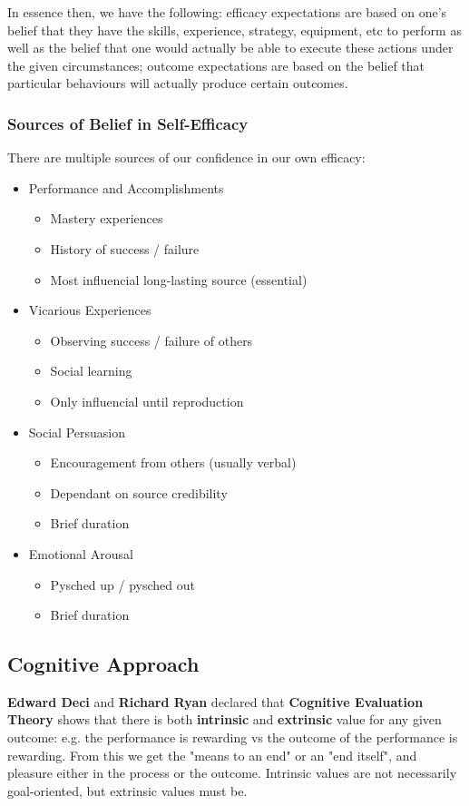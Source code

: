 \documentclass[12pt]{article}
\begin{document}
In essence then, we have the following: efficacy expectations are based on one's belief that they have the skills, experience, strategy, equipment, etc to perform as well as the belief that one would actually be able to execute these actions under the given circumstances; outcome expectations are based on the belief that particular behaviours will actually produce certain outcomes.

\subsubsection*{Sources of Belief in Self-Efficacy}
There are multiple sources of our confidence in our own efficacy:
\begin{itemize}
\item Performance and Accomplishments
\begin{itemize}
\item Mastery experiences
\item History of success / failure
\item Most influencial long-lasting source (essential)
\end{itemize}
\item Vicarious Experiences
\begin{itemize}
\item Observing success / failure of others
\item Social learning
\item Only influencial until reproduction
\end{itemize}
\item Social Persuasion
\begin{itemize}
\item Encouragement from others (usually verbal)
\item Dependant on source credibility
\item Brief duration
\end{itemize}
\item Emotional Arousal
\begin{itemize}
\item Pysched up / pysched out
\item Brief duration
\end{itemize}
\end{itemize}

\subsection*{Cognitive Approach}
{\bf Edward Deci} and {\bf Richard Ryan} declared that {\bf Cognitive Evaluation Theory} shows that there is both {\bf intrinsic} and {\bf extrinsic} value for any given outcome: e.g. the performance is rewarding vs the outcome of the performance is rewarding. From this we get the "means to an end" or an "end itself", and pleasure either in the process or the outcome. Intrinsic values are not necessarily goal-oriented, but extrinsic values must be.
\end{document}
